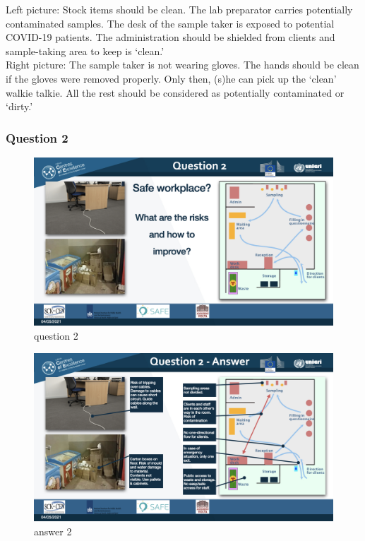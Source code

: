 \documentclass[
]{book}
\begin{document}
Left picture: Stock items should be clean. The lab preparator carries potentially contaminated samples. The desk of the sample taker is exposed to potential COVID-19 patients. The administration should be shielded from clients and sample-taking area to keep is `clean.'\\
Right picture: The sample taker is not wearing gloves. The hands should be clean if the gloves were removed properly. Only then, (s)he can pick up the `clean' walkie talkie. All the rest should be considered as potentially contaminated or `dirty.'

\hypertarget{question-2-3}{%
\subsubsection{Question 2}\label{question-2-3}}

\begin{figure}
\centering
\includegraphics{images/m05/m05_questions_v2.003.jpeg}
\caption{question 2}
\end{figure}

\begin{figure}
\centering
\includegraphics{images/m05/m05_questions_v2.004.jpeg}
\caption{answer 2}
\end{figure}
\end{document}
